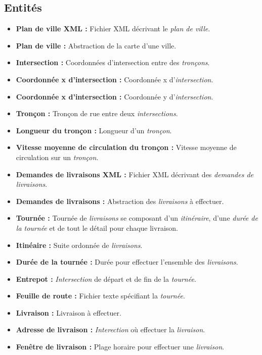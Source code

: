 \documentclass[10pt,a4paper]{book}
\begin{document}
\subsection{Entités}
\begin{itemize}
\item \textbf{Plan de ville XML :} Fichier XML décrivant le \textit{plan de ville}. \vskip1mm
\item \textbf{Plan de ville :} Abstraction de la carte d'une ville. \vskip1mm
\item \textbf{Intersection :} Coordonnées d'intersection entre des \textit{tronçons}. \vskip1mm
\item \textbf{Coordonnée x d'intersection :} Coordonnée x d'\textit{intersection}. \vskip1mm
\item \textbf{Coordonnée x d'intersection :} Coordonnée y d'\textit{intersection}. \vskip1mm
\item \textbf{Tronçon :} Tronçon de rue entre deux \textit{intersections}. \vskip1mm
\item \textbf{Longueur du tronçon :} Longueur d'un \textit{tronçon}. \vskip1mm
\item \textbf{Vitesse moyenne de circulation du tronçon :} Vitesse moyenne de circulation sur un \textit{tronçon}. \vskip1mm
\item \textbf{Demandes de livraisons XML :} Fichier XML décrivant des \textit{demandes de livraisons}. \vskip1mm
\item \textbf{Demandes de livraisons :} Abstraction des \textit{livraisons} à effectuer. \vskip1mm
\item \textbf{Tournée :} Tournée de \textit{livraisons} se composant d'un \textit{itinéraire}, d'une \textit{durée de la tournée} et de tout le détail pour chaque livraison. \vskip1mm
\item \textbf{Itinéaire :} Suite ordonnée de \textit{livraisons}. \vskip1mm
\item \textbf{Durée de la tournée :} Durée pour effectuer l'ensemble des \textit{livraisons}. \vskip1mm
\item \textbf{Entrepot :} \textit{Intersection} de départ et de fin de la \textit{tournée}. \vskip1mm
\item \textbf{Feuille de route :} Fichier texte spécifiant la \textit{tournée}. \vskip1mm
\item \textbf{Livraison :} Livraison à effectuer. \vskip1mm
\item \textbf{Adresse de livraison :} \textit{Interection} où effectuer la \textit{livraison}. \vskip1mm
\item \textbf{Fenêtre de livraison :} Plage horaire pour effectuer une \textit{livraison}. \vskip1mm

\end{itemize}
\end{document}
